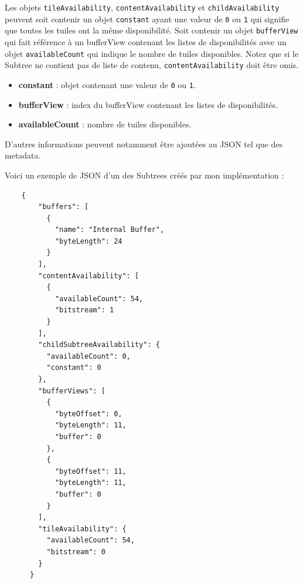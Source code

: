Les objets \texttt{tileAvailability}, \texttt{contentAvailability} et \texttt{childAvailability} peuvent soit contenir un objet \texttt{constant} ayant une valeur de \texttt{0} ou \texttt{1} qui signifie que toutes les tuiles ont la même disponibilité. Soit contenir un objet \texttt{bufferView} qui fait référence à un bufferView contenant les listes de disponibilités avec un objet \texttt{availableCount} qui indique le nombre de tuiles disponibles. Notez que si le Subtree ne contient pas de liste de contenu, \texttt{contentAvailability} doit être omis.

\begin{itemize}
    \item \textbf{constant} : objet contenant une valeur de \texttt{0} ou \texttt{1}.
    \item \textbf{bufferView} : index du bufferView contenant les listes de disponibilités.
    \item \textbf{availableCount} : nombre de tuiles disponibles.
\end{itemize}

D'autres informations peuvent notamment être ajoutées au JSON tel que des metadata.

\newpage
Voici un exemple de JSON d'un des Subtrees créés par mon implémentation :

\begin{verbatim}
    {
        "buffers": [
          {
            "name": "Internal Buffer",
            "byteLength": 24
          }
        ],
        "contentAvailability": [
          {
            "availableCount": 54,
            "bitstream": 1
          }
        ],
        "childSubtreeAvailability": {
          "availableCount": 0,
          "constant": 0
        },
        "bufferViews": [
          {
            "byteOffset": 0,
            "byteLength": 11,
            "buffer": 0
          },
          {
            "byteOffset": 11,
            "byteLength": 11,
            "buffer": 0
          }
        ],
        "tileAvailability": {
          "availableCount": 54,
          "bitstream": 0
        }
      }
\end{verbatim}